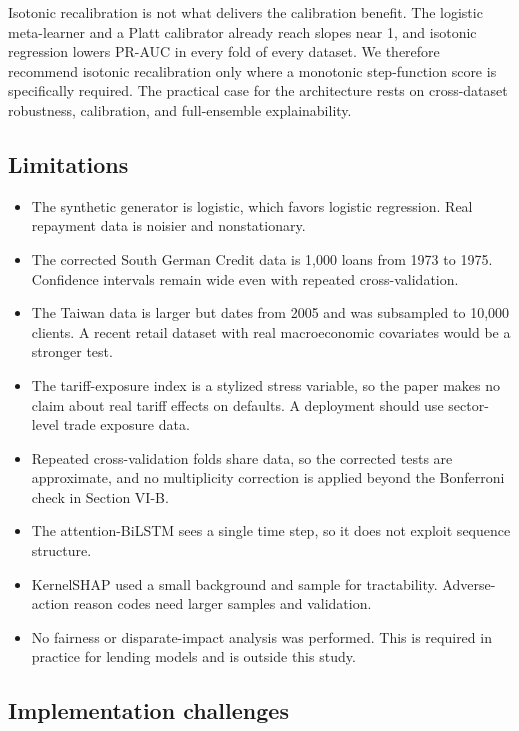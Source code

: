 \documentclass[conference,a4paper]{IEEEtran}
\begin{document}
Isotonic recalibration is not what delivers the calibration benefit. The logistic meta-learner and a Platt calibrator already reach slopes near 1, and isotonic regression lowers PR-AUC in every fold of every dataset. We therefore recommend isotonic recalibration only where a monotonic step-function score is specifically required. The practical case for the architecture rests on cross-dataset robustness, calibration, and full-ensemble explainability.

\subsection{Limitations}

\begin{itemize}

\item
  The synthetic generator is logistic, which favors logistic regression. Real repayment data is noisier and nonstationary.
\item
  The corrected South German Credit data is 1,000 loans from 1973 to 1975. Confidence intervals remain wide even with repeated cross-validation.
\item
  The Taiwan data is larger but dates from 2005 and was subsampled to 10,000 clients. A recent retail dataset with real macroeconomic covariates would be a stronger test.
\item
  The tariff-exposure index is a stylized stress variable, so the paper makes no claim about real tariff effects on defaults. A deployment should use sector-level trade exposure data.
\item
  Repeated cross-validation folds share data, so the corrected tests are approximate, and no multiplicity correction is applied beyond the Bonferroni check in Section VI-B.
\item
  The attention-BiLSTM sees a single time step, so it does not exploit sequence structure.
\item
  KernelSHAP used a small background and sample for tractability. Adverse-action reason codes need larger samples and validation.
\item
  No fairness or disparate-impact analysis was performed. This is required in practice for lending models and is outside this study.
\end{itemize}

\subsection{Implementation challenges}
\end{document}
